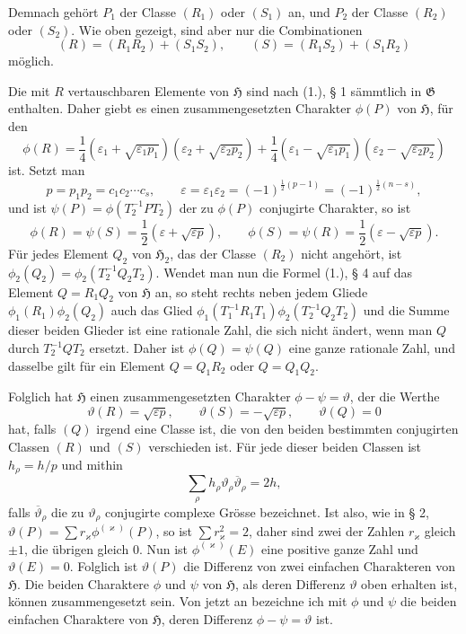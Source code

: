 \documentclass[11pt]{article}
\newcommand{\Hgr}{\mathfrak{H}}
\newcommand{\Ggr}{\mathfrak{G}}
\newcommand{\eps}{\varepsilon}
\begin{document}
Demnach gehört $P_1$ der Classe $(R_1)$ oder $(S_1)$ an, und $P_2$ der Classe $(R_2)$ oder $(S_2)$. Wie oben gezeigt, sind aber nur die Combinationen
\[
 (R)=(R_1R_2)+(S_1S_2),	\qquad (S)=(R_1S_2)+(S_1R_2)
\]
möglich.

Die mit $R$ vertauschbaren Elemente von $\Hgr$ sind nach (1.), § 1 sämmtlich in $\Ggr$ enthalten. Daher giebt es einen zusammengesetzten Charakter $\phi(P)$ von $\Hgr$, für den
\[
 \phi(R)=\frac14(\eps_1+\sqrt{\eps_1p_1})(\eps_2+\sqrt{\eps_2p_2})+\frac14(\eps_1-\sqrt{\eps_1p_1})(\eps_2-\sqrt{\eps_2p_2})
\]
ist. Setzt man
\[
 p=p_1p_2=c_1c_2\cdots c_s,	\qquad \eps=\eps_1\eps_2=(-1)^{\frac12(p-1)}=(-1)^{\frac12(n-s)},
\]
und ist $\psi(P)=\phi(T_2^{-1}PT_2)$ der zu $\phi(P)$ conjugirte Charakter, so ist
\[
 \phi(R)=\psi(S)=\frac12(\eps+\sqrt{\eps p}),	\qquad \phi(S)=\psi(R)=\frac12(\eps-\sqrt{\eps p}).
\]
Für jedes Element $Q_2$ von $\Hgr_2$, das der Classe $(R_2)$ nicht angehört, ist $\phi_2(Q_2)=\phi_2(T_2^{-1}Q_2T_2)$. Wendet man nun die Formel (1.), § 4 auf das Element $Q=R_1Q_2$ von $\Hgr$ an, so steht rechts neben jedem Gliede $\phi_1(R_1)\phi_2(Q_2)$ auch das Glied $\phi_1(T_1^{-1}R_1T_1)\phi_2(T_2^{-1}Q_2T_2)$ und die Summe dieser beiden Glieder ist eine rationale Zahl, die sich nicht ändert, wenn man $Q$ durch $T_2^{-1}QT_2$ ersetzt. Daher ist $\phi(Q)=\psi(Q)$ eine ganze rationale Zahl, und dasselbe gilt für ein Element $Q=Q_1R_2$ oder $Q=Q_1Q_2$.

Folglich hat $\Hgr$ einen zusammengesetzten Charakter $\phi-\psi=\vartheta$, der die Werthe
\begin{equation}\tag{1.}
 \vartheta(R)=\sqrt{\eps p},\qquad \vartheta(S)=-\sqrt{\eps p},\qquad \vartheta(Q)=0
\end{equation}
hat, falls $(Q)$ irgend eine Classe ist, die von den beiden bestimmten conjugirten Classen $(R)$ und $(S)$ verschieden ist. Für jede dieser beiden Classen ist $h_\rho=h/p$ und mithin
\[
 \sum_\rho h_\rho\vartheta_\rho\overline{\vartheta}_\rho=2h,
\]
falls $\overline{\vartheta}_\rho$ die zu $\vartheta_\rho$ conjugirte complexe Grösse bezeichnet. Ist also, wie in § 2, $\vartheta(P)=\sum r_\varkappa\phi^{(\varkappa)}(P)$, so ist $\sum r_\varkappa^2=2$, daher sind zwei der Zahlen $r_\varkappa$ gleich $\pm1$, die übrigen gleich $0$. Nun ist $\phi^{(\varkappa)}(E)$ eine positive ganze Zahl und $\vartheta(E)=0$. Folglich ist $\vartheta(P)$ die Differenz von zwei einfachen Charakteren von $\Hgr$. Die beiden Charaktere $\phi$ und $\psi$ von $\Hgr$, als deren Differenz $\vartheta$ oben erhalten ist, können zusammengesetzt sein. Von jetzt an bezeichne ich mit $\phi$ und $\psi$ die beiden einfachen Charaktere von $\Hgr$, deren Differenz $\phi-\psi=\vartheta$ ist.
\end{document}
